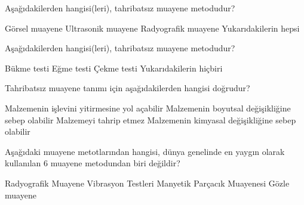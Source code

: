 
\begin{question}[subtitle=]
Aşağıdakilerden hangisi(leri), tahribatsız muayene metodudur?

	\begin{tasks}
		\task Görsel muayene
		\task Ultrasonik muayene
		\task Radyografik muayene 
		\task Yukarıdakilerin hepsi \correct
	\end{tasks}
\end{question}
\begin{solution}
	\correct
\end{solution}

\begin{question}[subtitle=]
	Aşağıdakilerden hangisi(leri), tahribatsız muayene metodudur?
	
	\begin{tasks}
		\task Bükme testi
		\task Eğme testi
		\task Çekme testi
		\task Yukarıdakilerin hiçbiri \correct
	\end{tasks}
\end{question}
\begin{solution}
	\correct
\end{solution}

\begin{question}[subtitle=]
	Tahribatsız muayene tanımı için aşağıdakilerden hangisi doğrudur?
	
	\begin{tasks}
		\task Malzemenin işlevini yitirmesine yol açabilir
		\task Malzemenin boyutsal değişikliğine sebep olabilir
		\task Malzemeyi tahrip etmez \correct
		\task Malzemenin kimyasal değişikliğine sebep olabilir
	\end{tasks}
\end{question}
\begin{solution}
	\correct
\end{solution}

\begin{question}[subtitle=]
	Aşağıdaki muayene metotlarından hangisi, dünya genelinde en yaygın olarak kullanılan 6 muayene metodundan biri değildir?
	
	\begin{tasks}
		\task Radyografik Muayene
		\task Vibrasyon Testleri \correct
		\task Manyetik Parçacık Muayenesi
		\task Gözle muayene
	\end{tasks}
\end{question}
\begin{solution}
	\correct
\end{solution}

